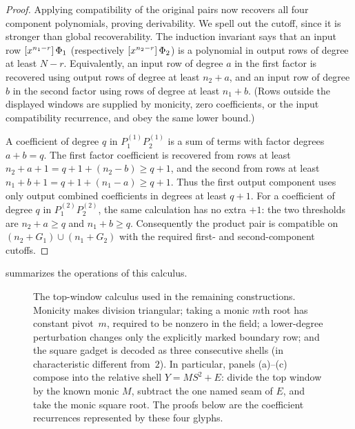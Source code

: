 \begin{proof}
    Applying compatibility of the original pairs now recovers all four
    component polynomials, proving derivability.
    We spell out the cutoff, since it is stronger than global recoverability.
    The induction invariant says that an input row
    $\coeff{\Phi_1}{n_1-r}$ (respectively
    $\coeff{\Phi_2}{n_2-r}$) is a polynomial in output rows of degree at least
    $N-r$.  Equivalently, an input row of degree $a$ in the first factor is
    recovered using output rows of degree at least $n_2+a$, and an input row
    of degree $b$ in the second factor using rows of degree at least $n_1+b$.
    (Rows outside the displayed windows are supplied by monicity, zero
    coefficients, or the input compatibility recurrence, and obey the same
    lower bound.)

    A coefficient of degree $q$ in $P^{(1)}_1P^{(1)}_2$ is a sum of terms with
    factor degrees $a+b=q$.  The first factor coefficient is recovered from
    rows at least $n_2+a+1=q+1+(n_2-b)\ge q+1$, and the second from rows at
    least $n_1+b+1=q+1+(n_1-a)\ge q+1$.  Thus the first output component uses
    only output combined coefficients in degrees at least $q+1$.  For a
    coefficient of degree $q$ in $P^{(2)}_1P^{(2)}_2$, the same calculation has
    no extra $+1$: the two thresholds are $n_2+a\ge q$ and $n_1+b\ge q$.
    Consequently the product pair is compatible on
    $(n_2+G_1)\cup(n_1+G_2)$ with the required first- and second-component
    cutoffs.
\end{proof}

 summarizes the operations of this calculus.

\begin{figure}[H]
  \centering
  \resizebox{\textwidth}{!}{}
  \caption{The top-window calculus used in the remaining constructions.
  Monicity makes division triangular; taking a monic $m$th root has constant
  pivot~$m$, required to be nonzero in the field; a lower-degree perturbation changes only the explicitly marked
  boundary row; and the square gadget is decoded as three consecutive
  shells (in characteristic different from~$2$).  In particular, panels (a)--(c) compose into the relative shell
  $Y=MS^2+E$: divide the top window by the known monic $M$, subtract the one
  named seam of $E$, and take the monic square root.  The proofs below are
  the coefficient recurrences represented by these four glyphs.}
  \label{fig:top-window-calculus}
\end{figure}


